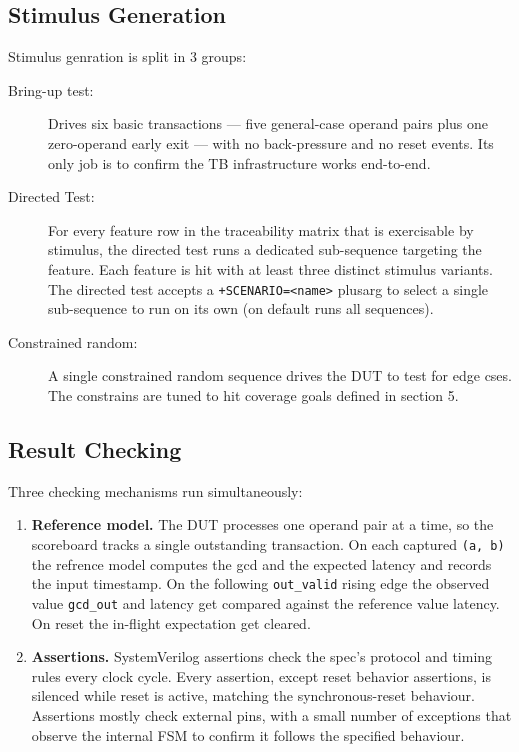 \documentclass[11pt,a4paper]{article}
\begin{document}
{ \subsection{Stimulus Generation}

Stimulus genration is split in 3 groups:

\begin{description}
    \item[Bring-up test:] Drives six basic transactions --- five general-case operand pairs plus one zero-operand early exit --- with no back-pressure and no reset events. Its only job is to confirm the TB infrastructure works end-to-end.

    \item[Directed Test:] For every feature row in the traceability matrix that is exercisable by stimulus, the directed test runs a dedicated sub-sequence targeting the feature. Each feature is hit  with at least three distinct stimulus variants. The directed test accepts a \texttt{+SCENARIO=<name>} plusarg to select a single sub-sequence to run on its own (on default runs all sequences).

    \item[Constrained random:] A single constrained random sequence drives the DUT to test for edge cses. The constrains are tuned to hit coverage goals defined in section 5.

\end{description}


 \subsection{Result Checking}

Three checking mechanisms run simultaneously:

\begin{enumerate}
    \item \textbf{Reference model.} The DUT processes one operand pair at a time, so the scoreboard tracks a single outstanding transaction. On each captured \texttt{(a, b)} the refrence model computes the gcd and the expected latency and records  the input timestamp. On the following \texttt{out\_valid} rising edge the observed value \texttt{gcd\_out} and latency get compared against the reference value latency. On reset the  in-flight expectation get cleared.

    \item \textbf{Assertions.} SystemVerilog assertions check the spec's protocol and timing rules every clock cycle. Every assertion, except reset behavior assertions, is silenced while reset is active, matching the synchronous-reset behaviour. Assertions mostly check external pins, with a small number of exceptions that observe the internal FSM to confirm it follows the specified behaviour.


\end{enumerate}}
\end{document}
